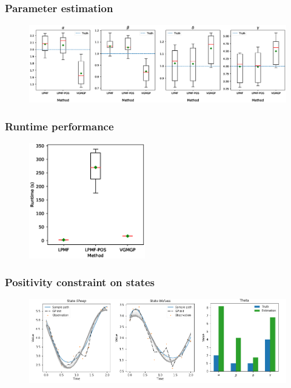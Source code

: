 \begin{frame}[t]
    \frametitle{Parameter estimation}
    \begin{figure}
        \centering
        \includegraphics[width=1\textwidth]{graphics/lotka-parameters-boxplot}
        \label{fig-lotka-parameters-boxplot}
    \end{figure}
\end{frame}

\begin{frame}[t]
    \frametitle{Runtime performance}
    \begin{figure}
        \centering
        \includegraphics[width=0.45\textwidth]{graphics/lotka-runtime-boxplot}
        \label{fig-lotka-runtime-boxplot}
    \end{figure}                                       
\end{frame}

\begin{frame}[t]
    \frametitle{Positivity constraint on states}
    \begin{figure}
        \centering
        \includegraphics[width=\textwidth]{graphics/lotka-fail}
        \label{fig-lotka-fail}
    \end{figure}     
\end{frame}

